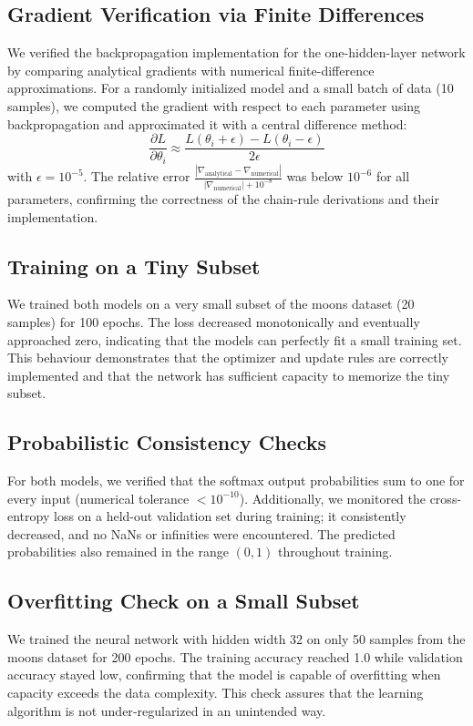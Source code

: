 \documentclass[11pt]{article}
\begin{document}
\subsection{Gradient Verification via Finite Differences}
We verified the backpropagation implementation for the one-hidden-layer network by comparing analytical gradients with numerical finite-difference approximations. For a randomly initialized model and a small batch of data (10 samples), we computed the gradient with respect to each parameter using backpropagation and approximated it with a central difference method:
\[
\frac{\partial L}{\partial \theta_i} \approx \frac{L(\theta_i + \epsilon) - L(\theta_i - \epsilon)}{2\epsilon}
\]
with \(\epsilon = 10^{-5}\). The relative error \(\frac{|\nabla_{\text{analytical}} - \nabla_{\text{numerical}}|}{|\nabla_{\text{numerical}}| + 10^{-8}}\) was below \(10^{-6}\) for all parameters, confirming the correctness of the chain‑rule derivations and their implementation.

\subsection{Training on a Tiny Subset}
We trained both models on a very small subset of the moons dataset (20 samples) for 100 epochs. The loss decreased monotonically and eventually approached zero, indicating that the models can perfectly fit a small training set. This behaviour demonstrates that the optimizer and update rules are correctly implemented and that the network has sufficient capacity to memorize the tiny subset.

\subsection{Probabilistic Consistency Checks}
For both models, we verified that the softmax output probabilities sum to one for every input (numerical tolerance \(<10^{-10}\)). Additionally, we monitored the cross-entropy loss on a held-out validation set during training; it consistently decreased, and no NaNs or infinities were encountered. The predicted probabilities also remained in the range \((0,1)\) throughout training.

\subsection{Overfitting Check on a Small Subset}
We trained the neural network with hidden width 32 on only 50 samples from the moons dataset for 200 epochs. The training accuracy reached 1.0 while validation accuracy stayed low, confirming that the model is capable of overfitting when capacity exceeds the data complexity. This check assures that the learning algorithm is not under‑regularized in an unintended way.
\end{document}
